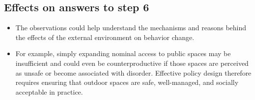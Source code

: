 \documentclass[
  letterpaper,
  DIV=11,
  numbers=noendperiod]{scrartcl}
\begin{document}
\subsection{Effects on answers to step
6}\label{effects-on-answers-to-step-6}

\begin{itemize}
\item
  The observations could help understand the mechanisms and reasons
  behind the effects of the external environment on behavior change.
\item
  For example, simply expanding nominal access to public spaces may be
  insufficient and could even be counterproductive if those spaces are
  perceived as unsafe or become associated with disorder. Effective
  policy design therefore requires ensuring that outdoor spaces are
  safe, well-managed, and socially acceptable in practice.
\end{itemize}
\end{document}
